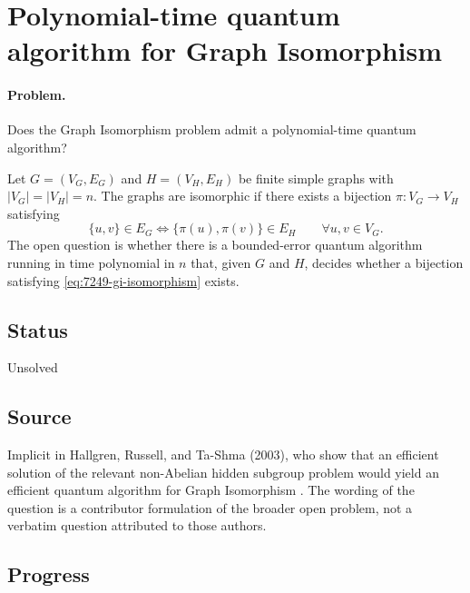 \section{Polynomial-time quantum algorithm for Graph Isomorphism}
\label{sec:op_7249a79e1534f6ab}

\paragraph{Problem.}
Does the Graph Isomorphism problem admit a polynomial-time quantum algorithm?

Let $G=(V_G,E_G)$ and $H=(V_H,E_H)$ be finite simple graphs with
$|V_G|=|V_H|=n$.  The graphs are isomorphic if there exists a bijection
$\pi:V_G\to V_H$ satisfying
\begin{equation}
  \{u,v\}\in E_G
  \Longleftrightarrow
  \{\pi(u),\pi(v)\}\in E_H
  \qquad
  \forall u,v\in V_G .
  \label{eq:7249-gi-isomorphism}
\end{equation}
The open question is whether there is a bounded-error quantum algorithm running
in time polynomial in $n$ that, given $G$ and $H$, decides whether a bijection
satisfying \eqref{eq:7249-gi-isomorphism} exists.

\subsection*{Status}

Unsolved

\subsection*{Source}

Implicit in Hallgren, Russell, and Ta-Shma (2003), who show that an
efficient solution of the relevant non-Abelian hidden subgroup problem would
yield an efficient quantum algorithm for Graph Isomorphism
.  The wording of the question is a
contributor formulation of the broader open problem, not a verbatim question
attributed to those authors.

\subsection*{Progress}

